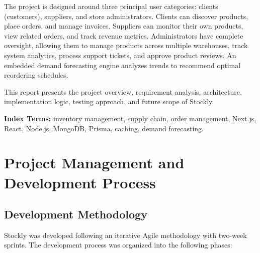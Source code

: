 \documentclass[12pt,onecolumn]{IEEEtran}
\let\oldsection\section
\renewcommand{\section}{\clearpage\oldsection}
\begin{document}
The project is designed around three principal user categories: clients (customers), suppliers, and store administrators. Clients can discover products, place orders, and manage invoices. Suppliers can monitor their own products, view related orders, and track revenue metrics. Administrators have complete oversight, allowing them to manage products across multiple warehouses, track system analytics, process support tickets, and approve product reviews. An embedded demand forecasting engine analyzes trends to recommend optimal reordering schedules.

This report presents the project overview, requirement analysis, architecture, implementation logic, testing approach, and future scope of Stockly. 

\noindent\textbf{Index Terms:} inventory management, supply chain, order management, Next.js, React, Node.js, MongoDB, Prisma, caching, demand forecasting.

\tableofcontents
\clearpage



\section{Project Management and Development Process}


\subsection{Development Methodology}

Stockly was developed following an iterative Agile methodology with two-week sprints. The development process was organized into the following phases:
\end{document}
